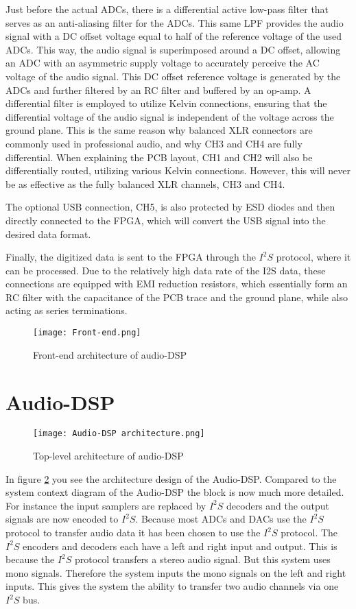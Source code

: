 Just before the actual ADCs, there is a differential active low-pass filter that serves as an anti-aliasing filter for the ADCs. This same LPF provides the audio signal with a DC offset voltage equal to half of the reference voltage of the used ADCs. This way, the audio signal is superimposed around a DC offset, allowing an ADC with an asymmetric supply voltage to accurately perceive the AC voltage of the audio signal. This DC offset reference voltage is generated by the ADCs and further filtered by an RC filter and buffered by an op-amp. A differential filter is employed to utilize Kelvin connections, ensuring that the differential voltage of the audio signal is independent of the voltage across the ground plane. This is the same reason why balanced XLR connectors are commonly used in professional audio, and why CH3 and CH4 are fully differential. When explaining the PCB layout, CH1 and CH2 will also be differentially routed, utilizing various Kelvin connections. However, this will never be as effective as the fully balanced XLR channels, CH3 and CH4.

The optional USB connection, CH5, is also protected by ESD diodes and then directly connected to the FPGA, which will convert the USB signal into the desired data format.

Finally, the digitized data is sent to the FPGA through the $I^2S$ protocol, where it can be processed. Due to the relatively high data rate of the I2S data, these connections are equipped with EMI reduction resistors, which essentially form an RC filter with the capacitance of the PCB trace and the ground plane, while also acting as series terminations.

\begin{figure}[ht]
    \texttt{[image: Front-end.png]}\\    
    \caption{Front-end architecture of audio-DSP}
    \label{fig:arch-front-end}
\end{figure}

\section{Audio-DSP}
\begin{figure}[ht]
    \texttt{[image: Audio-DSP architecture.png]}\\    
    \caption{Top-level architecture of audio-DSP}
    \label{fig:arch-top}
\end{figure}

In figure \ref{fig:arch-top} you see the architecture design of the Audio-DSP. Compared to the system context diagram of the Audio-DSP the block is now much more detailed. For instance the input samplers are replaced by $I^2S$ decoders and the output signals are now encoded to $I^2S$. Because most ADCs and DACs use the $I^2S$ protocol to transfer audio data it has been chosen to use the $I^2S$ protocol. The $I^2S$ encoders and decoders each have a left and right input and output. This is because the $I^2S$ protocol transfers a stereo audio signal. But this system uses mono signals. Therefore the system inputs the mono signals on the left and right inputs. This gives the system the ability to transfer two audio channels via one $I^2S$ bus.

